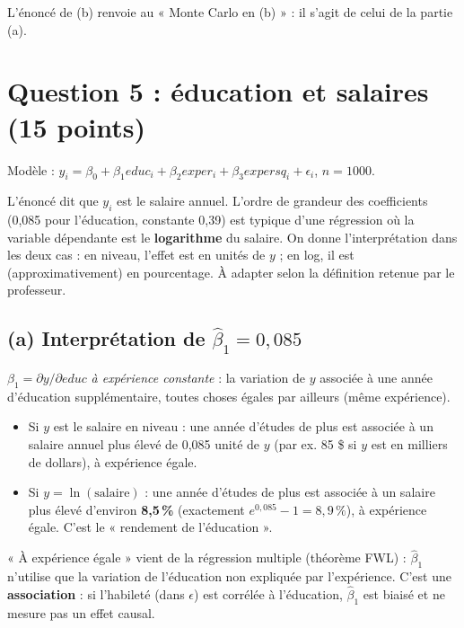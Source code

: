 \documentclass[11pt,a4paper]{article}
\begin{document}
\begin{attention}
L'énoncé de (b) renvoie au « Monte Carlo en (b) » : il s'agit de celui de la partie (a).
\end{attention}

\section{Question 5 : éducation et salaires (15 points)}

Modèle : $y_i=\beta_0+\beta_1educ_i+\beta_2exper_i+\beta_3expersq_i+\epsilon_i$, $n=1000$.

\begin{attention}[title={Unité de $y$}]
L'énoncé dit que $y_i$ est le salaire annuel. L'ordre de grandeur des coefficients (0,085 pour l'éducation, constante 0,39) est typique d'une régression où la variable dépendante est le \textbf{logarithme} du salaire. On donne l'interprétation dans les deux cas : en niveau, l'effet est en unités de $y$ ; en log, il est (approximativement) en pourcentage. À adapter selon la définition retenue par le professeur.
\end{attention}

\subsection*{(a) Interprétation de $\hat\beta_1=0{,}085$}

$\beta_1=\partial y/\partial educ$ \emph{à expérience constante} : la variation de $y$ associée à une année d'éducation supplémentaire, toutes choses égales par ailleurs (même expérience).

\begin{reponse}
\begin{itemize}[nosep]
\item Si $y$ est le salaire en niveau : une année d'études de plus est associée à un salaire annuel plus élevé de 0,085 unité de $y$ (par ex. 85 \$ si $y$ est en milliers de dollars), à expérience égale.
\item Si $y=\ln(\text{salaire})$ : une année d'études de plus est associée à un salaire plus élevé d'environ \textbf{8,5\,\%} (exactement $e^{0{,}085}-1=8{,}9\,\%$), à expérience égale. C'est le « rendement de l'éducation ».
\end{itemize}
« À expérience égale » vient de la régression multiple (théorème FWL) : $\hat\beta_1$ n'utilise que la variation de l'éducation non expliquée par l'expérience. C'est une \textbf{association} : si l'habileté (dans $\epsilon$) est corrélée à l'éducation, $\hat\beta_1$ est biaisé et ne mesure pas un effet causal.
\end{reponse}
\end{document}
